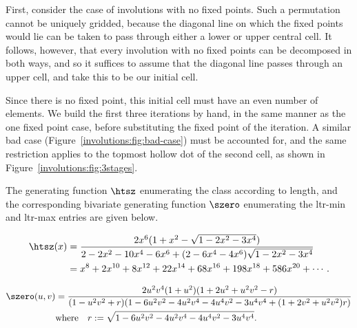 \documentclass[12pt,twoside]{memoir}
\begin{document}
      First, consider the case of involutions with no fixed points. Such a
      permutation cannot be uniquely gridded, because the diagonal line on which
      the fixed points would lie can be taken to pass through either a lower or
      upper central cell. It follows, however, that every involution with no
      fixed points can be decomposed in both ways, and so it suffices to assume
      that the diagonal line passes through an upper cell, and take this to be
      our initial cell. 

      Since there is no fixed point, this initial cell must have an even number
      of elements. We build the first three iterations by hand, in the same
      manner as the one fixed point case, before substituting the fixed point of
      the iteration. A similar bad case (Figure~\ref{involutions:fig:bad-case})
      must be accounted for, and the same restriction applies to the topmost
      hollow dot of the second cell, as shown in
      Figure~\ref{involutions:fig:3stages}. 

      The generating function $\htsz$ enumerating the class according to length, and the
      corresponding bivariate generating function $\szero$ enumerating the
      ltr-min and ltr-max entries are given below. 

      {\small
      \begin{equation} \label{involutions:eqn:htszero}
        \begin{split}
        \htsz(x) &=
        \frac{2x^6(1+x^2-\sqrt{1-2x^2-3x^4})}{2-2x^2-10x^4-6x^6+(2-6x^4-4x^6)\sqrt{1-2x^2-3x^4}}\\
        &= x^8+2x^{10}+8x^{12}+22x^{14}+68x^{16}+198x^{18}+586x^{20}+\cdots.
        \end{split}
      \end{equation}

      \begin{equation} \label{involutions:eqn:szero}
        \begin{split}
        \szero(u,v)
        &= \frac{2u^2v^4(1+u^2)(1+2u^2+u^2v^2-r)}
        {(1-u^2v^2+r)(1-6u^2v^2-4u^2v^4-4u^4v^2-3u^4v^4+(1+2v^2+u^2v^2)r)} \\
          &\text{where} \quad r := \sqrt{1-6u^2v^2-4u^2v^4-4u^4v^2-3u^4v^4}.
        \end{split}
      \end{equation}
      }
\end{document}

